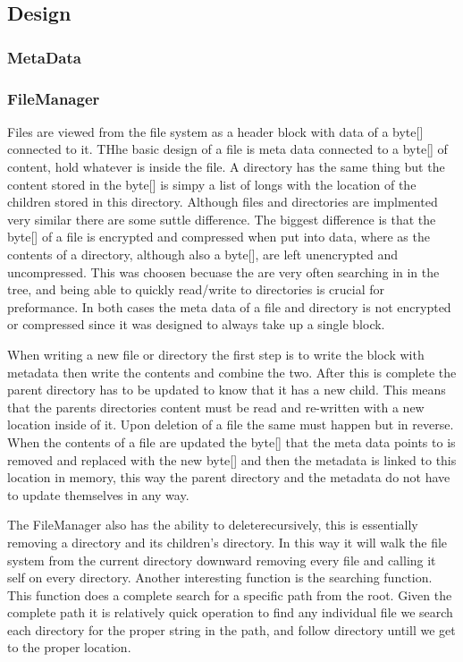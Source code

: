 \documentclass[12pt]{article}
\begin{document}
\subsection{Design}
\subsubsection{MetaData}
\subsubsection{FileManager}

Files are viewed from the file system as a header block with data of a byte[] connected to it.  THhe basic design of a file is meta data connected to a byte[] of content, hold whatever is inside the file.  A directory has the same thing but the content stored in the byte[] is simpy a list of longs with the location of the children stored in this directory.  Although files and directories are implmented very similar there are some suttle difference.  The biggest difference is that the byte[] of a file is encrypted and compressed when put into data, where as the contents of a directory, although also a byte[], are left unencrypted and uncompressed.  This was choosen becuase the are very often searching in in the tree, and being able to quickly read/write to directories is crucial for preformance.  In both cases the meta data of a file and directory is not encrypted or compressed since it was designed to always take up a single block.

When writing a new file or directory the first step is to write the block with metadata then write the contents and combine the two.  After this is complete the parent directory has to be updated to know that it has a new child. This means that the parents directories content must be read and re-written with a new location inside of it.  Upon deletion of a file the same must happen but in reverse. When the contents of a file are updated the byte[] that the meta data points to is removed and replaced with the new byte[] and then the metadata is linked to this location in memory, this way the parent directory and the metadata do not have to update themselves in any way.

The FileManager also has the ability to deleterecursively, this is essentially removing a directory and its children's directory.  In this way it will walk the file system from the current directory downward removing every file and calling it self on every directory.  Another interesting function is the searching function.  This function does a complete search for a specific path from the root.  Given the complete path it is relatively quick operation to find any individual file we search each directory for the proper string in the path, and follow directory untill we get to the proper location.
\end{document}
